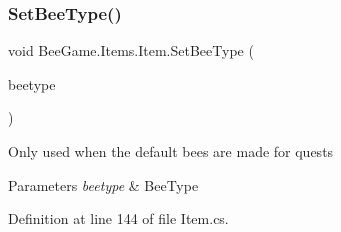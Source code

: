 \subsubsection{\texorpdfstring{Set\+Bee\+Type()}{SetBeeType()}}
{\footnotesize\ttfamily void Bee\+Game.\+Items.\+Item.\+Set\+Bee\+Type (\begin{DoxyParamCaption}\item[{\hyperlink{namespace_bee_game_1_1_enums_a9376a1582db99d20c756e24de728944f}{Bee\+Type}}]{beetype }\end{DoxyParamCaption})}



Only used when the default bees are made for quests 


\begin{DoxyParams}{Parameters}
{\em beetype} & Bee\+Type\\
\hline
\end{DoxyParams}


Definition at line 144 of file Item.\+cs.


